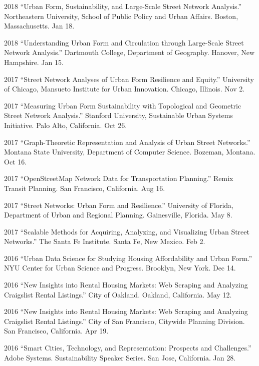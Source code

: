 \documentclass[11pt,letterpaper]{report}
\begin{document}
\begin{tablist}
        \item[2018] \tab{}\enquote{Urban Form, Sustainability, and Large-Scale Street Network Analysis.} Northeastern University, School of Public Policy and Urban Affairs. Boston, Massachusetts. Jan 18.

        \item[2018] \tab{}\enquote{Understanding Urban Form and Circulation through Large-Scale Street Network Analysis.} Dartmouth College, Department of Geography. Hanover, New Hampshire. Jan 15.

        \item[2017] \tab{}\enquote{Street Network Analyses of Urban Form Resilience and Equity.} University of Chicago, Mansueto Institute for Urban Innovation. Chicago, Illinois. Nov 2.

        \item[2017] \tab{}\enquote{Measuring Urban Form Sustainability with Topological and Geometric Street Network Analysis.} Stanford University, Sustainable Urban Systems Initiative. Palo Alto, California. Oct 26.

        \item[2017] \tab{}\enquote{Graph-Theoretic Representation and Analysis of Urban Street Networks.} Montana State University, Department of Computer Science. Bozeman, Montana. Oct 16.

        \item[2017] \tab{}\enquote{OpenStreetMap Network Data for Transportation Planning.} Remix Transit Planning. San Francisco, California. Aug 16.

        \item[2017] \tab{}\enquote{Street Networks: Urban Form and Resilience.} University of Florida, Department of Urban and Regional Planning. Gainesville, Florida. May 8.

        \item[2017] \tab{}\enquote{Scalable Methods for Acquiring, Analyzing, and Visualizing Urban Street Networks.} The Santa Fe Institute. Santa Fe, New Mexico. Feb 2.

        \item[2016] \tab{}\enquote{Urban Data Science for Studying Housing Affordability and Urban Form.} NYU Center for Urban Science and Progress. Brooklyn, New York. Dec 14.

        \item[2016] \tab{}\enquote{New Insights into Rental Housing Markets: Web Scraping and Analyzing Craigslist Rental Listings.} City of Oakland. Oakland, California. May 12.

        \item[2016] \tab{}\enquote{New Insights into Rental Housing Markets: Web Scraping and Analyzing Craigslist Rental Listings.} City of San Francisco, Citywide Planning Division. San Francisco, California. Apr 19.

        \item[2016] \tab{}\enquote{Smart Cities, Technology, and Representation: Prospects and Challenges.} Adobe Systems. Sustainability Speaker Series. San Jose, California. Jan 28.

    \end{tablist}
\end{document}
